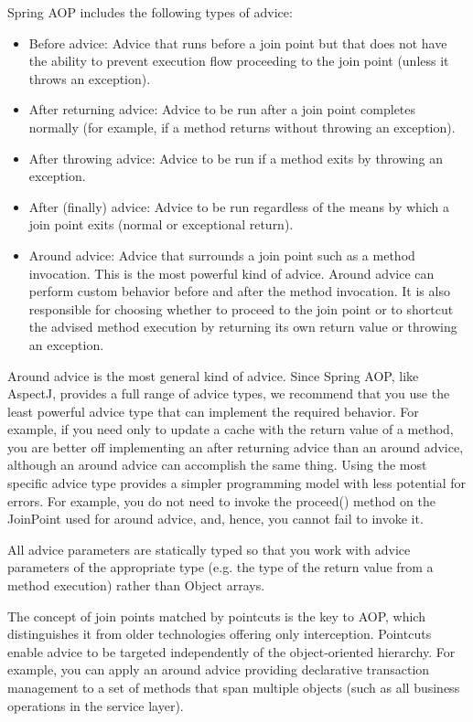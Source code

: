 Spring AOP includes the following types of advice:

\begin{itemize}
    \item Before advice: Advice that runs before a join point but that does not have the ability to prevent
    execution flow proceeding to the join point (unless it throws an exception).
    \item After returning advice: Advice to be run after a join point completes normally (for example, if a
    method returns without throwing an exception).
    \item After throwing advice: Advice to be run if a method exits by throwing an exception.
    \item After (finally) advice: Advice to be run regardless of the means by which a join point exits
    (normal or exceptional return).
    \item  Around advice: Advice that surrounds a join point such as a method invocation. This is the most
    powerful kind of advice. Around advice can perform custom behavior before and after the
    method invocation. It is also responsible for choosing whether to proceed to the join point or to
    shortcut the advised method execution by returning its own return value or throwing an
    exception.
\end{itemize}

Around advice is the most general kind of advice. Since Spring AOP, like AspectJ, provides a full
range of advice types, we recommend that you use the least powerful advice type that can
implement the required behavior. For example, if you need only to update a cache with the return
value of a method, you are better off implementing an after returning advice than an around
advice, although an around advice can accomplish the same thing. Using the most specific advice
type provides a simpler programming model with less potential for errors. For example, you do not
need to invoke the proceed() method on the JoinPoint used for around advice, and, hence, you
cannot fail to invoke it.

All advice parameters are statically typed so that you work with advice parameters of the
appropriate type (e.g. the type of the return value from a method execution) rather than Object
arrays.

The concept of join points matched by pointcuts is the key to AOP, which distinguishes it from older
technologies offering only interception. Pointcuts enable advice to be targeted independently of the
object-oriented hierarchy. For example, you can apply an around advice providing declarative
transaction management to a set of methods that span multiple objects (such as all business
operations in the service layer).

